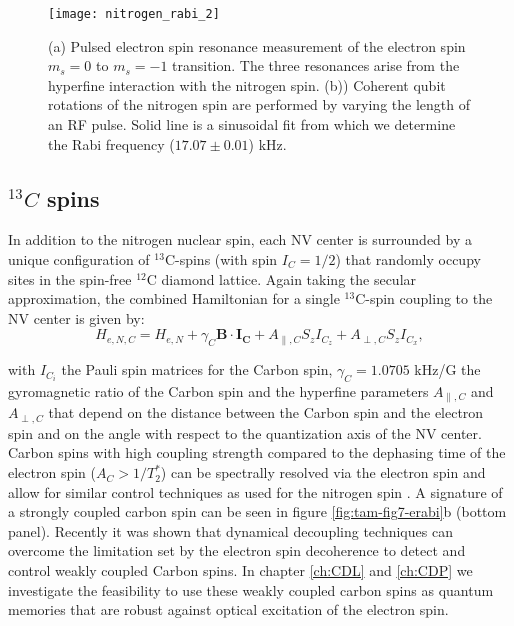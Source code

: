 \begin{figure*}
	\centering
	\texttt{[image: nitrogen\_rabi\_2]}
	\caption{\label{fig:tam-fig10-nrabi} \textbf{} (a) Pulsed electron spin resonance measurement of the electron spin $m_s = 0$ to $m_s = -1$ transition. The three resonances arise from the hyperfine interaction with the nitrogen spin. (b)) Coherent qubit rotations of the nitrogen spin are performed by varying the length of an RF pulse. Solid line is a sinusoidal fit from which we determine the Rabi frequency ($17.07 \pm 0.01$) kHz.}
\end{figure*}

\subsection{$^{13}C$ spins}
In addition to the nitrogen nuclear spin, each NV center is surrounded by a unique configuration of $^{13}$C-spins (with spin $I_C = 1/2$) that randomly occupy sites in the spin-free $^{12}$C diamond lattice. Again taking the secular approximation, the combined Hamiltonian for a single $^{13}$C-spin coupling to the NV center is given by:
\begin{equation}
H_{e,N,C} = H_{e,N} + \gamma_C \mathbf{B} \cdot \mathbf{I_C} + A_{\parallel,C} S_z I_{C_z} + A_{\perp,C} S_z I_{C_x},
\end{equation}

with $I_{C_i}$ the Pauli spin matrices for the Carbon spin, $\gamma_C = 1.0705$ kHz/G the gyromagnetic ratio of the Carbon spin and the hyperfine parameters $A_{\parallel,C}$ and $A_{\perp,C}$ that depend on the distance between the Carbon spin and the electron spin and on the angle with respect to the quantization axis of the NV center. Carbon spins with high coupling strength compared to the dephasing time of the electron spin ($A_C > 1/T_2^*$) can be spectrally resolved via the electron spin and allow for similar control techniques as used for the nitrogen spin \cite{Jelezko_Phys.Rev.Lett._2004,Dutt_Science_2007,Neumann_Science_2008,Jiang_Science_2009,Smeltzer_Phys.Rev.A_2009}. A signature of a strongly coupled carbon spin can be seen in figure \ref{fig:tam-fig7-erabi}b (bottom panel). Recently it was shown that dynamical decoupling techniques can overcome the limitation set by the electron spin decoherence to detect\cite{Taminiau_Phys.Rev.Lett._2012,Kolkowitz_Phys.Rev.Lett._2012,Zhao_NatNano_2012} and control\cite{Taminiau_NatNano_2014} weakly coupled Carbon spins. In chapter \ref{ch:CDL} and \ref{ch:CDP} we investigate the feasibility to use these weakly coupled carbon spins as quantum memories that are robust against optical excitation of the electron spin.

